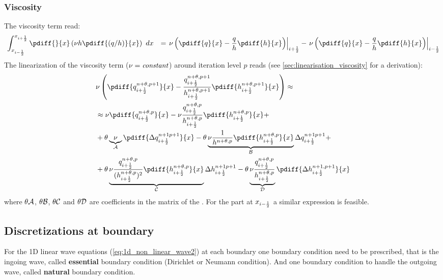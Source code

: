 \subsubsection{Viscosity}
The viscosity term read:
\begin{align}
    &  \int^{x_{i+\half}}_{x_{i-\half}} \pdiff{}{x} \left( \nu h \pdiff{(q/h)}{x} \right)\ dx & =
    \left. \nu \left( \pdiff{q}{x} - \frac{q}{h} \pdiff{h}{x} \right) \right|_{i+\half} - \left. \nu \left( \pdiff{q}{x} - \frac{q}{h} \pdiff{h}{x} \right) \right|_{i-\half}
\end{align}
The linearization of the viscosity term ($\nu = {\it constant}$) around iteration level $p$ reads (see \autoref{sec:linearisation_viscosity} for a derivation):
\begin{align}
    &\nu \left(\pdiff{q^{n+\theta, p+1}_{i+\half}}{x} - \frac{q^{n+\theta, p+1}_{i+\half}}{h^{n+\theta, p+1}_{i+\half}} \pdiff{h^{n+\theta, p+1}_{i+\half}}{x} \right) \approx
    \\
    & \approx \nu  \pdiff{q^{n+\theta, p}_{i+\half}}{x}   -  \nu \frac{q^{n+\theta, p}_{i+\half}}{h^{n+\theta, p}_{i+\half}} \pdiff{h^{n+\theta, p}_{i+\half}}{x}  +
    \nonumber \\
    & + \theta \underbrace{\nu}_{\cal{A}} \pdiff{\Delta q^{n+1 p+1}_{i+\half}}{x}
    -  \theta \underbrace{\nu \frac{1}{h^{n+\theta, p}}\pdiff{h^{n+\theta, p}_{i+\half}}{x}}_{\cal{B}} \Delta q^{n+1 p+1}_{i+\half}  +
    \nonumber \\
    & + \theta \underbrace{\nu \frac{q^{n+\theta, p}_{i+\half}}{(h^{n+\theta, p}_{i+\half})^2} \pdiff{h^{n+\theta, p}_{i+\half}}{x}}_{\cal{C}} \Delta h^{n+1 p+1}_{i+\half}
    - \theta \underbrace{\nu \frac{q^{n+\theta, p}_{i+\half}}{h^{n+\theta, p}_{i+\half}}}_{\cal{D}} \pdiff{\Delta h^{n+1, p+1}_{i+\half}}{x}
\end{align}
where $\theta \cal{A}$, $\theta \cal{B}$, $\theta \cal{C}$ and $\theta \cal{D}$ are coefficients in the matrix of the \deltaformulation.
For the part at $x_{i-\frac{1}{2}}$ a similar expression is feasible.

\subsection{Discretizations at boundary}
For the 1D linear wave equations (\autoref{eq:1d_non_linear_wave2}) at each boundary one boundary condition need to be prescribed, that is the ingoing wave, called \textbf{essential} boundary condition (Dirichlet or Neumann condition).
And one boundary condition to handle the outgoing wave, called \textbf{natural} boundary condition.

